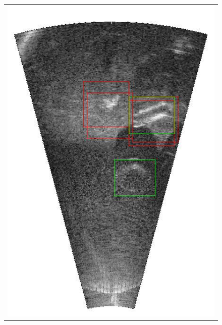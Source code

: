\begin{figure}[!p]
{\begin{tabular}[b]{c}
		\includegraphics[height=0.22\textheight]{chapters/images/proposals/errors/2016-02-11_070611-frame02478-proposals.jpg}

\end{tabular}}
\end{figure}
